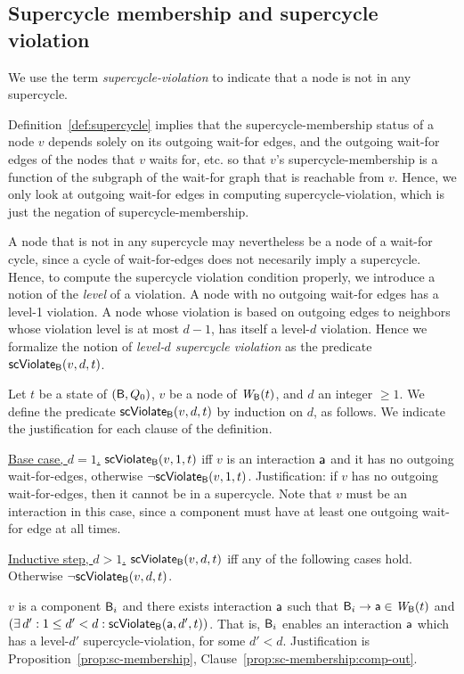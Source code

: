 \subsection{Supercycle membership and supercycle violation}

We use the term \emph{supercycle-violation} to indicate that a node is not in any supercycle. 

Definition~\ref{def:supercycle} implies that the supercycle-membership status of a node $v$ depends
solely on its outgoing wait-for edges, and the outgoing wait-for edges of the nodes that $v$ waits
for, etc. so that $v$'s supercycle-membership is a function of the subgraph of the wait-for graph
that is reachable from $v$.  Hence, we only look at outgoing wait-for edges in computing
supercycle-violation, which is just the negation of supercycle-membership.

A node that is not in any supercycle may nevertheless be a node of a wait-for cycle, since a cycle
of wait-for-edges does not necesarily imply a supercycle. Hence, to compute the supercycle violation
condition properly, we introduce a notion of the \emph{level} of a violation. A node with no
outgoing wait-for edges has a level-1 violation. A node whose violation is based on outgoing edges
to neighbors whose violation level is at most $d-1$, has itself a level-$d$ violation.  Hence we
formalize the notion of \emph{level-$d$ supercycle violation} as the predicate $\mathsf{scViolate}_{\mathsf{B}}(v,d,t)$.


\label{def:supercycle-violation}
\label{def:supercycle.violation}
Let $t$ be a state of $(\mathsf{B}, Q_0)$, $v$ be a node of $\mathit{W}_{\mathsf{B}}({t})$, and $d$ an integer $\ge 1$.
We define the predicate $\mathsf{scViolate}_{\mathsf{B}}(v,d,t)$ by induction on $d$, as follows. We indicate the
justification for each clause of the definition.

\noindent
\ul{Base case, $d=1$.} $\mathsf{scViolate}_{\mathsf{B}}(v,1,t)$ iff $v$ is an interaction $\mathsf{a}$ and it has no outgoing wait-for-edges, otherwise $\neg \mathsf{scViolate}_{\mathsf{B}}(v,1,t)$.
%
Justification: if $v$ has no outgoing wait-for-edges, then it cannot be in a supercycle.  Note that $v$ must be an
interaction in this case, since a component must have at least one outgoing wait-for edge at all times.

\noindent
\ul{Inductive step, $d > 1$.}  $\mathsf{scViolate}_{\mathsf{B}}(v,d,t)$ iff any of the following cases hold. Otherwise $\neg \mathsf{scViolate}_{\mathsf{B}}(v,d,t)$.

\bn

\item  \label{def:supercycle.violation.component.out}
$v$ is a component $\mathsf{B}_i$ and there exists interaction $\mathsf{a}$ such that $\mathsf{B}_i \rightarrow \mathsf{a} \in \mathit{W}_{\mathsf{B}}({t})$ and $(\exists\, d' : 1 \le d' < d: \mathsf{scViolate}_{\mathsf{B}}(\mathsf{a},d',t))$.
That is, $\mathsf{B}_i$ enables an interaction $\mathsf{a}$ which has a level-$d'$ supercycle-violation, for some $d' < d$.
Justification is Proposition~\ref{prop:sc-membership}, Clause~\ref{prop:sc-membership:comp-out}.


